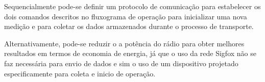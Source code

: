 Sequencialmente pode-se definir um protocolo de comunicação para estabelecer os dois comandos descritos no fluxograma de operação para inicializar uma nova medição e para coletar os dados armazenados durante o processo de transporte.

Alternativamente, pode-se reduzir o a potência do rádio para obter melhores resultados em termos de economia de energia, já que o uso da rede Sigfox não se faz necessária para envio de dados e sim o uso de um dispositivo projetado especificamente para coleta e inicio de operação.

